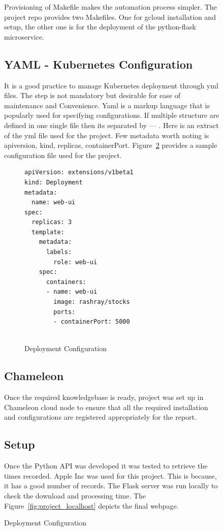 \begin{figure}[htb]
Provisioning of Makefile makes the automation process simpler. The project
repo provides two Makefiles. One for gcloud installation and setup, the other
one is for the deployment of the python-flask microservice.
  
\subsection{YAML - Kubernetes Configuration}
It is a good practice to manage Kubernetes deployment through yml files. The
step is not mandatory but desirable for ease of maintenance and Convenience.
Yaml is a markup language that is popularly used for specifying
configurations. If multiple structure are defined in one single file then its
separated by --- . Here is an extract of the yml file used for the project.
Few metadata worth noting is apiversion, kind, replicas, containerPort.
Figure~\ref{F:svc-setup} provides a sample configuration file used for the
project.

\begin{figure}
\begin{footnotesize}  
\begin{verbatim}
apiVersion: extensions/v1beta1
kind: Deployment
metadata:
  name: web-ui
spec:
  replicas: 3
  template:
    metadata:
      labels:
        role: web-ui
    spec:
      containers:
      - name: web-ui
        image: rashray/stocks
        ports:
        - containerPort: 5000
  
\end{verbatim}
\end{footnotesize}
\caption{Deployment Configuration}\label{F:svc-setup}
\end{figure}
\subsection{Chameleon}
Once the required knowledgebase is ready, project was set up in Chameleon
cloud node to ensure that all the required installation and configurations are
registered appropriately for the report.

\subsection{Setup}

Once the Python API was developed it was tested to retrieve the times
recorded. Apple Inc was used for this project. This is because, it has a good
number of records. The Flask server was run locally to check the download and
processing time. The Figure~\ref{fig:project_localhost} depicts the final
webpage.


\end{figure}
